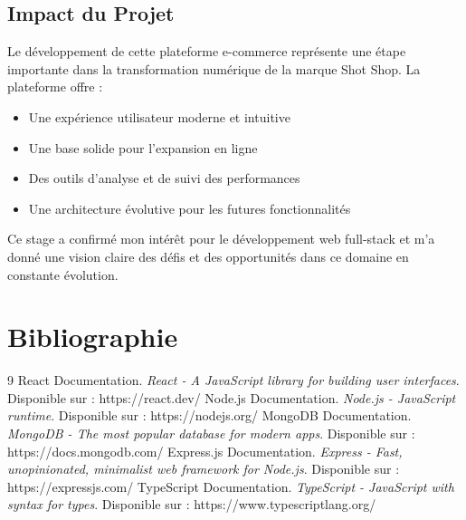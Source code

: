 \documentclass[12pt,a4paper]{article}
\begin{document}
\subsection{Impact du Projet}
Le développement de cette plateforme e-commerce représente une étape importante dans la transformation numérique de la marque Shot Shop. La plateforme offre :

\begin{itemize}
    \item Une expérience utilisateur moderne et intuitive
    \item Une base solide pour l'expansion en ligne
    \item Des outils d'analyse et de suivi des performances
    \item Une architecture évolutive pour les futures fonctionnalités
\end{itemize}

Ce stage a confirmé mon intérêt pour le développement web full-stack et m'a donné une vision claire des défis et des opportunités dans ce domaine en constante évolution.

\section*{Bibliographie}
\begin{thebibliography}{9}
 React Documentation. \textit{React - A JavaScript library for building user interfaces}. Disponible sur : https://react.dev/
 Node.js Documentation. \textit{Node.js - JavaScript runtime}. Disponible sur : https://nodejs.org/
 MongoDB Documentation. \textit{MongoDB - The most popular database for modern apps}. Disponible sur : https://docs.mongodb.com/
 Express.js Documentation. \textit{Express - Fast, unopinionated, minimalist web framework for Node.js}. Disponible sur : https://expressjs.com/
 TypeScript Documentation. \textit{TypeScript - JavaScript with syntax for types}. Disponible sur : https://www.typescriptlang.org/
\end{thebibliography}
\end{document}
